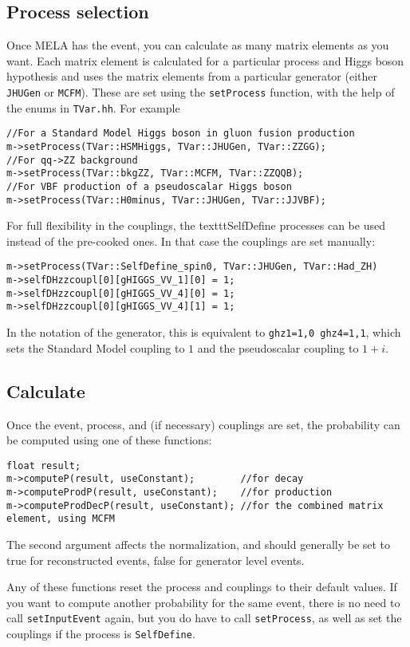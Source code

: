 \documentclass[aps,superscriptaddress,nofootinbib]{revtex4}
\begin{document}
\subsection{Process selection}
Once MELA has the event, you can calculate as many matrix elements as you want.  Each matrix element is calculated for a particular process and Higgs boson hypothesis and uses the matrix elements from a particular generator (either \texttt{JHUGen} or \texttt{MCFM}).  These are set using the \texttt{setProcess} function, with the help of the enums in \texttt{TVar.hh}.  For example
\begin{verbatim}
//For a Standard Model Higgs boson in gluon fusion production
m->setProcess(TVar::HSMHiggs, TVar::JHUGen, TVar::ZZGG);
//For qq->ZZ background
m->setProcess(TVar::bkgZZ, TVar::MCFM, TVar::ZZQQB);
//For VBF production of a pseudoscalar Higgs boson
m->setProcess(TVar::H0minus, TVar::JHUGen, TVar::JJVBF);
\end{verbatim}

For full flexibility in the couplings, the texttt{SelfDefine} processes can be used instead of the pre-cooked ones.  In that case the couplings are set manually:
\begin{verbatim}
m->setProcess(TVar::SelfDefine_spin0, TVar::JHUGen, TVar::Had_ZH)
m->selfDHzzcoupl[0][gHIGGS_VV_1][0] = 1;
m->selfDHzzcoupl[0][gHIGGS_VV_4][0] = 1;
m->selfDHzzcoupl[0][gHIGGS_VV_4][1] = 1;
\end{verbatim}
In the notation of the generator, this is equivalent to \texttt{ghz1=1,0 ghz4=1,1}, which sets the Standard Model coupling to $1$ and the pseudoscalar coupling to $1+i$.

\subsection{Calculate}
Once the event, process, and (if necessary) couplings are set, the probability can be computed using one of these functions:
\begin{verbatim}
float result;
m->computeP(result, useConstant);        //for decay
m->computeProdP(result, useConstant);    //for production
m->computeProdDecP(result, useConstant); //for the combined matrix element, using MCFM
\end{verbatim}
The second argument affects the normalization, and should generally be set to true for reconstructed events, false for generator level events.

Any of these functions reset the process and couplings to their default values.  If you want to compute another probability for the same event, there is no need to call \texttt{setInputEvent} again, but you do have to call \texttt{setProcess}, as well as set the couplings if the process is \texttt{SelfDefine}.
\end{document}
